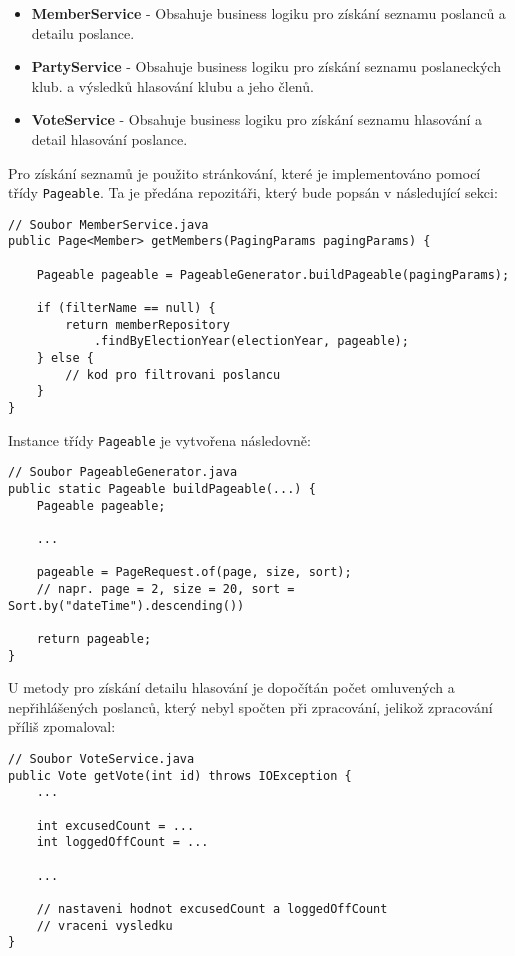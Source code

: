 \begin{itemize}
	\item \textbf{MemberService} - Obsahuje business logiku pro získání seznamu poslanců a detailu poslance.
	\item \textbf{PartyService} - Obsahuje business logiku pro získání seznamu poslaneckých klub. a výsledků hlasování klubu a jeho členů.
	\item \textbf{VoteService} - Obsahuje business logiku pro získání seznamu hlasování a detail hlasování poslance.
\end{itemize}

\noindent Pro získání seznamů je použito stránkování, které je implementováno pomocí třídy \lstinline|Pageable|. Ta je předána repozitáři, který bude popsán v následující sekci:

\newpage

\begin{lstlisting}[caption={Ukázka doménové vrstvy pro vrácení seznamu poslanců}, label={lst:headers-paging}, tabsize=2]
// Soubor MemberService.java
public Page<Member> getMembers(PagingParams pagingParams) {
	
	Pageable pageable = PageableGenerator.buildPageable(pagingParams);
	
	if (filterName == null) {
		return memberRepository
			.findByElectionYear(electionYear, pageable);
	} else {
		// kod pro filtrovani poslancu
	}
}
\end{lstlisting}

\noindent Instance třídy \lstinline|Pageable| je vytvořena následovně:

\begin{lstlisting}[caption={Ukázka kódu pro sestavení objektu pro stránkování}, label={lst:paging-object}, tabsize=2]
// Soubor PageableGenerator.java
public static Pageable buildPageable(...) {
	Pageable pageable;
	
	...
	
	pageable = PageRequest.of(page, size, sort);
	// napr. page = 2, size = 20, sort = Sort.by("dateTime").descending())
	
	return pageable;
}

\end{lstlisting}

\noindent U metody pro získání detailu hlasování je dopočítán počet omluvených a nepřihlášených \linebreak poslanců, který nebyl spočten při zpracování, jelikož zpracování příliš zpomaloval:

\begin{lstlisting}[caption={Ukázka dopočtu statistik pro detail hlasování za běhu v doménové vrstvě}, label={lst:excused-count}, tabsize=2]
// Soubor VoteService.java
public Vote getVote(int id) throws IOException {
	...
	
	int excusedCount = ... 	
	int loggedOffCount = ...
	
	...
	
	// nastaveni hodnot excusedCount a loggedOffCount
	// vraceni vysledku
}
\end{lstlisting}

